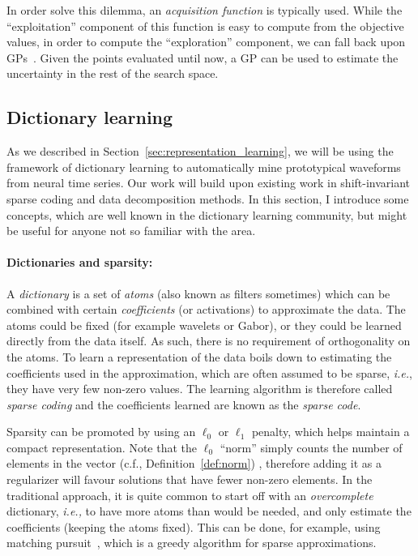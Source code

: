 In order solve this dilemma, an \emph{acquisition function} is typically used. While the ``exploitation'' component of this function is easy to compute from the objective values, in order to compute the ``exploration'' component, we can fall back upon \acp{GP}~\citep{rasmussen2004gaussian}. Given the points evaluated until now, a \ac{GP} can be used to estimate the uncertainty in the rest of the search space. 

\subsection{Dictionary learning}
\label{sec:background_dict_learning}

As we described in Section~\ref{sec:representation_learning}, we will be using the framework of dictionary learning to automatically mine prototypical waveforms from neural time series. Our work will build upon existing work in shift-invariant sparse coding and data decomposition methods. In this section, I introduce some concepts, which are well known in the dictionary learning community, but might be useful for anyone not so familiar with the area.

\paragraph{Dictionaries and sparsity:} A \emph{dictionary} is a set of \emph{atoms} (also known as filters sometimes) which can be combined with certain \emph{coefficients} (or activations) to approximate the data. 
The atoms could be fixed (for example wavelets or Gabor), or they could be learned directly from the data itself. As such, there is no requirement of orthogonality on the atoms. 
To learn a representation of the data boils down to estimating the coefficients used in the approximation, which are often assumed to be sparse, \emph{i.e.}, they have very few non-zero values. 
The learning algorithm is therefore called \emph{sparse coding} and the coefficients learned are known as the \emph{sparse code}.

Sparsity can be promoted by using an $\ell_0$ or $\ell_1$ penalty, which helps maintain a compact representation. Note that the $\ell_0$ ``norm'' simply counts the number of elements in the vector (c.f., Definition~\ref{def:norm}) , therefore adding it as a regularizer will favour solutions that have fewer non-zero elements. In the traditional approach, it is quite common to start off with an \emph{overcomplete} dictionary, \emph{i.e.,} to have more atoms than would be needed, and only estimate the coefficients (keeping the atoms fixed). This can be done, for example, using matching pursuit~\citep{mallat1993matching}, which is a greedy algorithm for sparse approximations.


